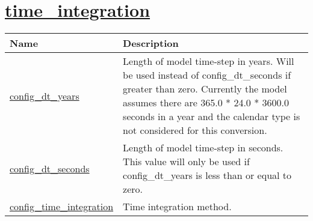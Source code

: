 \section[time\_integration]{\hyperref[sec:nm_sec_time_integration]{time\_integration}}
\label{sec:nm_tab_time_integration}

{\small
\begin{center}
\begin{longtable}{| p{2.0in} || p{4.0in} |}
	\hline
	{\bf Name} & {\bf Description} \\
	\hline
	\hline
	\hyperref[subsec:nm_sec_config_dt_years]{config\_dt\_years} & Length of model time-step in years.  Will be used instead of config\_dt\_seconds if greater than zero.  Currently the model assumes there are 365.0 * 24.0 * 3600.0 seconds in a year and the calendar type is not considered for this conversion. \\
	\hline
	\hyperref[subsec:nm_sec_config_dt_seconds]{config\_dt\_seconds} & Length of model time-step in seconds.  This value will only be used if config\_dt\_years is less than or equal to zero. \\
	\hline
	\hyperref[subsec:nm_sec_config_time_integration]{config\_time\_integration} & Time integration method. \\
	\hline
\end{longtable}
\end{center}
}
